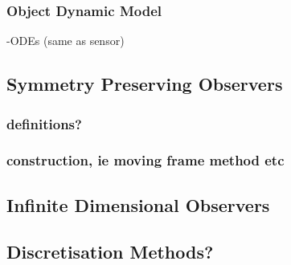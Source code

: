 	\subsubsection{Object Dynamic Model}
		-ODEs (same as sensor)
		
\subsection{Symmetry Preserving Observers}
	\subsubsection{definitions?}
	\subsubsection{construction, ie moving frame method etc}
\subsection{Infinite Dimensional Observers}
\subsection{Discretisation Methods?}